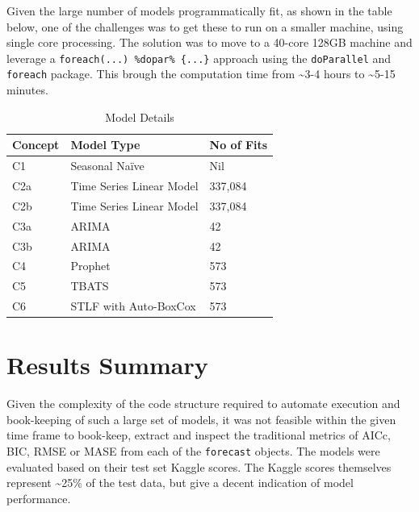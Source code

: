 \documentclass[floatsintext,man]{apa6}
\theoremstyle{definition}
\theoremstyle{definition}
\theoremstyle{definition}
\theoremstyle{remark}
\begin{document}
Given the large number of models programmatically fit, as shown in the
table below, one of the challenges was to get these to run on a smaller
machine, using single core processing. The solution was to move to a
40-core 128GB machine and leverage a
\texttt{foreach(...)\ \%dopar\%\ \{...\}} approach using the
\texttt{doParallel} and \texttt{foreach} package. This brough the
computation time from \textasciitilde{}3-4 hours to
\textasciitilde{}5-15 minutes.

\begin{table}[H]

\caption{\label{tab:unnamed-chunk-6}Model Details}
\centering
\begin{tabular}[t]{lll}
\toprule
Concept & Model Type & No of Fits\\
\midrule
C1 & Seasonal Naïve & Nil\\
C2a & Time Series Linear Model & 337,084\\
C2b & Time Series Linear Model & 337,084\\
C3a & ARIMA & 42\\
C3b & ARIMA & 42\\
\addlinespace
C4 & Prophet & 573\\
C5 & TBATS & 573\\
C6 & STLF with Auto-BoxCox & 573\\
\bottomrule
\end{tabular}
\end{table}

\section{Results Summary}\label{results-summary}

Given the complexity of the code structure required to automate
execution and book-keeping of such a large set of models, it was not
feasible within the given time frame to book-keep, extract and inspect
the traditional metrics of AICc, BIC, RMSE or MASE from each of the
\texttt{forecast} objects. The models were evaluated based on their test
set Kaggle scores. The Kaggle scores themselves represent
\textasciitilde{}25\% of the test data, but give a decent indication of
model performance.
\end{document}
